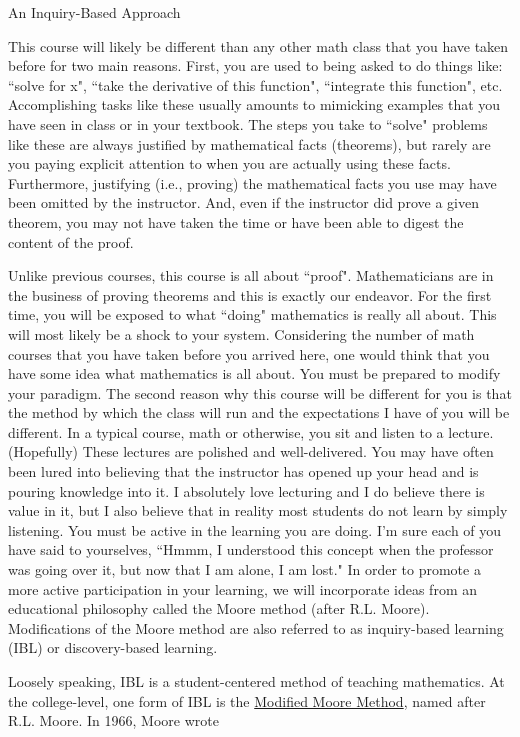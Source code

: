 \begin{section*}{An Inquiry-Based Approach}

This course will likely be different than any other math class that you have taken before for two main reasons. First, you are used to being asked to do things like: ``solve for x", ``take the derivative of this function", ``integrate this function", etc. Accomplishing tasks like these usually amounts to mimicking examples that you have seen in class or in your textbook. The steps you take to ``solve" problems like these are always justified by mathematical facts (theorems), but rarely are you paying explicit attention to when you are actually using these facts. Furthermore, justifying (i.e., proving) the mathematical facts you use may have been omitted by the instructor. And, even if the instructor did prove a given theorem, you may not have taken the time or have been able to digest the content of the proof.

Unlike previous courses, this course is all about ``proof". Mathematicians are in the business of proving theorems and this is exactly our endeavor. For the first time, you will be exposed to what ``doing" mathematics is really all about. This will most likely be a shock to your system. Considering the number of math courses that you have taken before you arrived here, one would think that you have some idea what mathematics is all about. You must be prepared to modify your paradigm. The second reason why this course will be different for you is that the method by which the class will run and the expectations I have of you will be different. In a typical course, math or otherwise, you sit and listen to a lecture. (Hopefully) These lectures are polished and well-delivered. You may have often been lured into believing that the instructor has opened up your head and is pouring knowledge into it. I absolutely love lecturing and I do believe there is value in it, but I also believe that in reality most students do not learn by simply listening. You must be active in the learning you are doing. I'm sure each of you have said to yourselves, ``Hmmm, I understood this concept when the professor was going over it, but now that I am alone, I am lost." In order to promote a more active participation in your learning, we will incorporate ideas from an educational philosophy called the Moore method (after R.L. Moore). Modifications of the Moore method are also referred to as inquiry-based learning (IBL) or discovery-based learning.

Loosely speaking, IBL is a student-centered method of teaching mathematics. At the college-level, one form of IBL is the \href{http://legacyrlmoore.org/method.html}{Modified Moore Method}, named after R.L. Moore.  In 1966, Moore wrote


\end{section*}
